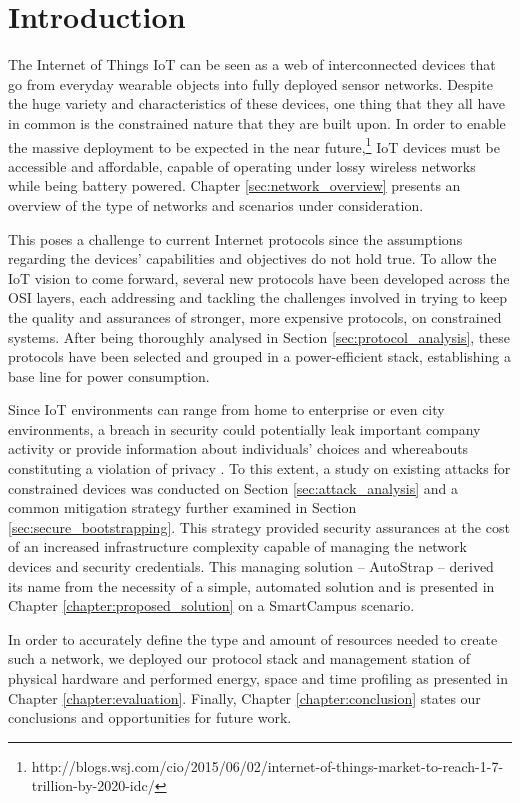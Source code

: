 
\chapter{Introduction}
\label{chapter:introduction}
The Internet of Things \gls{IoT} can be seen as a web of interconnected devices that go from everyday wearable objects into fully deployed sensor networks. Despite the huge variety and characteristics of these devices, one thing that they all have in common is the constrained nature that they are built upon. In order to enable the massive deployment to be expected in the near future,\footnote{http://blogs.wsj.com/cio/2015/06/02/internet-of-things-market-to-reach-1-7-trillion-by-2020-idc/} \gls{IoT} devices must be accessible and affordable, capable of operating under lossy wireless networks while being battery powered. Chapter \ref{sec:network_overview} presents an overview of the type of networks and scenarios under consideration.

	This poses a challenge to current Internet protocols since the assumptions regarding the devices' capabilities and objectives do not hold true. To allow the \gls{IoT} vision to come forward, several new protocols have been developed across the OSI layers, each addressing and tackling the challenges involved in trying to keep the quality and assurances of stronger, more expensive protocols, on constrained systems. After being thoroughly analysed in Section \ref{sec:protocol_analysis}, these protocols have been selected and grouped in a power-efficient stack, establishing a base line for power consumption. 
	
	Since \gls{IoT} environments can range from home to enterprise or even city environments, a breach in security could potentially leak important company activity or provide information about individuals' choices and whereabouts constituting a violation of privacy \cite{Ukil2015}. To this extent, a study on existing attacks for constrained devices was conducted on Section \ref{sec:attack_analysis} and a common mitigation strategy further examined in Section \ref{sec:secure_bootstrapping}. This strategy provided security assurances at the cost of an increased infrastructure complexity capable of managing the network devices and security credentials. This managing solution -- AutoStrap -- derived its name from the necessity of a simple, automated solution and is presented in Chapter \ref{chapter:proposed_solution} on a SmartCampus scenario. 
	
	In order to accurately define the type and amount of resources needed to create such a network, we deployed our protocol stack and management station of physical hardware and performed energy, space and time profiling as presented in Chapter \ref{chapter:evaluation}. Finally, Chapter \ref{chapter:conclusion} states our conclusions and opportunities for future work.